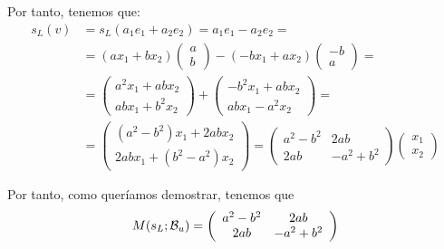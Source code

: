 \begin{ejercicio}
    Por tanto, tenemos que:
    \begin{equation*}
        \begin{split}
            s_L(v)& = s_L(a_1e_1+a_2e_2) = a_1e_1-a_2e_2 =\\
            &= (ax_1+bx_2)\left(\begin{array}{c}
                 a \\ b
            \end{array}\right) -(-bx_1+ax_2)\left(\begin{array}{c}
                 -b \\ a
            \end{array}\right) =\\
            &= \left(\begin{array}{c}
                 a^2x_1 +abx_2 \\ abx_1+b^2x_2
            \end{array}\right)
            + \left(\begin{array}{c}
                 -b^2x_1 +abx_2 \\ abx_1-a^2x_2
            \end{array}\right) =\\
            &= \left(\begin{array}{c}
                 (a^2-b^2)x_1+2abx_2 \\ 2abx_1 + (b^2-a^2)x_2
            \end{array}\right)
            = \left(\begin{array}{cc}
                 a^2-b^2 & 2ab \\
                 2ab & -a^2 + b^2
            \end{array}\right)
            \left(\begin{array}{c}
                 x_1 \\ x_2
            \end{array}\right)
        \end{split}
    \end{equation*}

    Por tanto, como queríamos demostrar, tenemos que
    \begin{equation*}
        M(s_L;\mathcal{B}_u) = \left(\begin{array}{cc}
            a^2-b^2 & 2ab \\
            2ab & -a^2+b^2
        \end{array}\right)
    \end{equation*}



\end{ejercicio}
